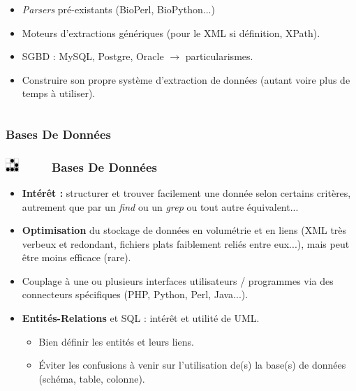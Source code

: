 \documentclass[slidetop,11pt]{beamer}
\def\sectionPartIbDE{Bases De Donn{\'e}es}
\def\moreInFrameTitle{\includegraphics[height=0.5cm]{img/logo_glider.png}~~~~~}
\begin{document}
\begin{frame}
\begin{columns}[t]
\begin{column}[c]{6cm}
\begin{beamerboxesrounded}	[lower=substructureTR, %
		 				 upper=block title TR,%
						 shadow=true]
\begin{itemize}
				\item \emph{Parsers} pr{\'e}-existants (BioPerl, BioPython...)
				\item Moteurs d'extractions g{\'e}n{\'e}riques (pour le XML si d{\'e}finition, XPath). 
				\item SGBD : MySQL, Postgre, Oracle $\rightarrow$ particularismes. 
				\item Construire son propre syst{\`e}me d'extraction de donn{\'e}es (autant voire plus de temps {\`a} utiliser). 
			\end{itemize}
		 \end{beamerboxesrounded}
	\end{column}
	\end{columns}
\end{frame} 

\subsubsection{\sectionPartIbDE}
\begin{frame}
	\frametitle{\moreInFrameTitle \sectionPartIbDE}
	\begin{itemize}		 
		\item \textbf{Int{\'e}r{\^e}t : } structurer et trouver facilement une donn{\'e}e selon certains crit{\`e}res, autrement que par un \emph{find} ou un \emph{grep} ou tout autre {\'e}quivalent...~\\
		\item \textbf{Optimisation} du stockage de donn{\'e}es en volum{\'e}trie et en liens (XML tr{\`e}s verbeux et redondant, fichiers plats faiblement reli{\'e}s entre eux...), mais peut {\^e}tre moins efficace (rare). 
		\item Couplage {\`a} une ou plusieurs interfaces utilisateurs / programmes via des connecteurs sp{\'e}cifiques (PHP, Python, Perl, Java...). 
		\item \textbf{Entit{\'e}s-Relations} et SQL : int{\'e}r{\^e}t et utilit{\'e} de UML. 
		\begin{itemize}
			\item Bien d{\'e}finir les entit{\'e}s et leurs liens. 
			\item {\'E}viter les confusions {\`a} venir sur l'utilisation de(s) la base(s) de donn{\'e}es (sch{\'e}ma, table, colonne). 
		\end{itemize}
	\end{itemize}
\end{frame} 
\end{document}
